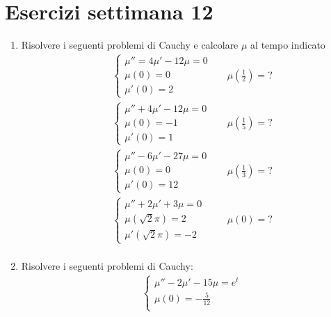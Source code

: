 \section{Esercizi settimana 12}
\begin{enumerate}
	\item Risolvere i seguenti problemi di Cauchy e calcolare $ \mu  $ al tempo indicato
	      \begin{align*}
		       &
		      \begin{cases}
			      \mu '' = 4 \mu ' - 12 \mu  = 0 \\
			      \mu  \left(0\right)=0          \\
			      \mu ' \left(0\right) = 2
		      \end{cases}
		       &   & \mu \left(\frac{1}{2}\right) = ? \\
		       &
		      \begin{cases}
			      \mu '' + 4 \mu ' - 12 \mu  = 0 \\
			      \mu  \left(0\right) = -1       \\
			      \mu ' \left(0\right) = 1
		      \end{cases}
		       &   & \mu \left(\frac{1}{5}\right) = ? \\
		       &
		      \begin{cases}
			      \mu '' - 6 \mu ' - 27 \mu  = 0 \\
			      \mu  \left(0\right) =0         \\
			      \mu  ' \left(0\right) = 12
		      \end{cases}
		       &   & \mu \left(\frac{1}{3}\right) =?  \\
		       &
		      \begin{cases}
			      \mu  '' + 2 \mu ' + 3 \mu  = 0     \\
			      \mu \left(\sqrt{2} \pi \right) = 2 \\
			      \mu ' \left(\sqrt{2} \pi \right) = -2
		      \end{cases}
		       &   & \mu \left(0\right)=?             \\
	      \end{align*}
	\item Risolvere i seguenti problemi di Cauchy:
	      \begin{align*}
		       &
		      \begin{cases}
			      \mu '' - 2 \mu ' - 15 \mu  = e^{t}  \\
			      \mu \left(0\right) = - \frac{5}{12} \\

\end{cases}
\end{align*}
\end{enumerate}
